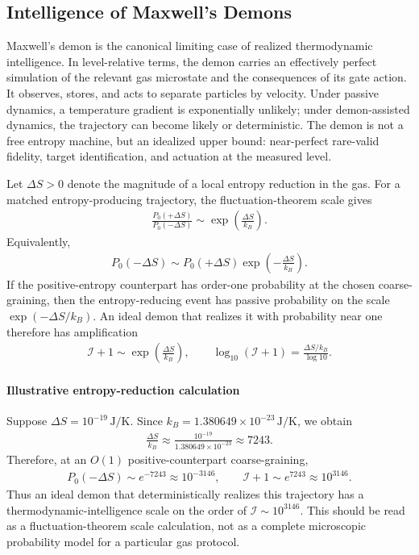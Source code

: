 \documentclass[
  aps,
  prresearch,
  reprint,
  amsmath,
  amssymb,
  superscriptaddress,
  nofootinbib,
  longbibliography
]{revtex4-2}
\def\EQSP{3pt}
\newcommand{\cgather}[2][\EQSP]{\begingroup\setlength\abovedisplayskip{#1}\setlength\belowdisplayskip{#1}\begin{gather} #2 \end{gather}\endgroup\noindent}
\newcommand{\cgathers}[2][\EQSP]{\begingroup\setlength\abovedisplayskip{#1}\setlength\belowdisplayskip{#1}\begin{gather*} #2 \end{gather*}\endgroup\noindent}
\newcommand{\calI}{\mathcal{I}}
\begin{document}
\subsection{Intelligence of Maxwell's Demons}
\label{sec:demon}

Maxwell's demon is the canonical limiting case of realized thermodynamic intelligence. In level-relative terms, the demon carries an effectively perfect simulation of the relevant gas microstate and the consequences of its gate action. It observes, stores, and acts to separate particles by velocity. Under passive dynamics, a temperature gradient is exponentially unlikely; under demon-assisted dynamics, the trajectory can become likely or deterministic. The demon is not a free entropy machine, but an idealized upper bound: near-perfect rare-valid fidelity, target identification, and actuation at the measured level.

Let \(\Delta S>0\) denote the magnitude of a local entropy reduction in the gas. For a matched entropy-producing trajectory, the fluctuation-theorem scale gives
\cgather{
    \frac{P_0(+\Delta S)}{P_0(-\Delta S)}
    \sim
    \exp\left(\frac{\Delta S}{k_B}\right).
}
Equivalently,
\cgather{
    P_0(-\Delta S)
    \sim
    P_0(+\Delta S)
    \exp\left(-\frac{\Delta S}{k_B}\right).
}
If the positive-entropy counterpart has order-one probability at the chosen coarse-graining, then the entropy-reducing event has passive probability on the scale \(\exp(-\Delta S/k_B)\). An ideal demon that realizes it with probability near one therefore has amplification
\cgather{
    \calI+1
    \sim
    \exp\left(\frac{\Delta S}{k_B}\right),
    \qquad
    \log_{10}(\calI+1)
    =
    \frac{\Delta S/k_B}{\log 10}.
    \label{eq:fluctuation_demon_scale}
}

\paragraph{Illustrative entropy-reduction calculation}

Suppose \(\Delta S=10^{-19}\,\mathrm{J/K}\). Since \(k_B=1.380649\times 10^{-23}\,\mathrm{J/K}\), we obtain
\cgather{
    \frac{\Delta S}{k_B}
    \approx
    \frac{10^{-19}}{1.380649\times 10^{-23}}
    \approx
    7243.
}
Therefore, at an \(O(1)\) positive-counterpart coarse-graining,
\cgathers{
    P_0(-\Delta S)
    \sim
    e^{-7243}
    \approx
    10^{-3146},
    \qquad
    \calI+1
    \sim
    e^{7243}
    \approx
    10^{3146}.
}
Thus an ideal demon that deterministically realizes this trajectory has a thermodynamic-intelligence scale on the order of \(\calI\sim 10^{3146}\). This should be read as a fluctuation-theorem scale calculation, not as a complete microscopic probability model for a particular gas protocol.
\end{document}
